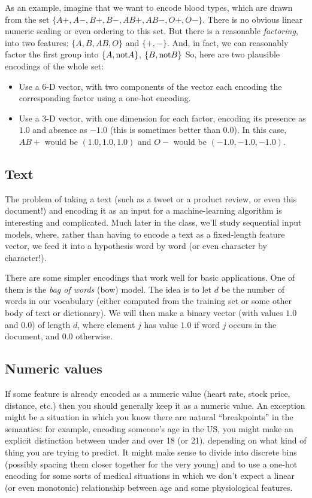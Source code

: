 As an example, imagine that we want to encode blood types, which are
drawn from the set $\{A+, A-, B+, B-, AB+, AB-, O+, O-\}$.  
There is no obvious linear numeric scaling or even ordering to this
set.  But there is a reasonable {\em factoring}, into two features:
$\{A, B, AB, O\}$ and $\{+, -\}$.  And, in fact, we can reasonably
factor the first group into $\{A, {\rm not}A\}$, $\{B, {\rm not}B\}$
   So, here are two plausible
encodings of the whole set:
\begin{itemize}
\item Use a 6-D vector, with two components of the vector each encoding the
  corresponding factor using a one-hot encoding.
\item Use a 3-D vector, with one dimension for each factor, encoding
  its presence as $1.0$ and absence as $-1.0$ (this is sometimes
  better than $0.0$).  In this case, $AB+$ would be $(1.0, 1.0, 1.0)$
  and $O-$ would be $(-1.0, -1.0, -1.0)$.
\end{itemize}

\subsection{Text}
The problem of taking a text (such as a tweet or a product review, or
even this document!) and encoding it as an input for a
machine-learning algorithm is interesting and complicated.  Much later
in the class, we'll study sequential input models, where, rather than
having to encode a text as a fixed-length feature vector, we feed it
into a hypothesis word by word (or even character by character!).

There are some simpler encodings that work well for basic
applications.  One of them is the {\em bag of words} ({\sc bow})
model.  The idea is to let $d$ be the number of words in our
vocabulary (either computed from the training set or some other body
of text or dictionary).  We will then make a binary vector (with
values $1.0$ and $0.0$) of length $d$, where element $j$ has value
$1.0$ if word $j$ occurs in the document, and $0.0$ otherwise.

\subsection{Numeric values}
\label{realFeatures}
If some feature is already encoded as a numeric value (heart rate,
stock price, distance, etc.) then you should generally keep it as a
numeric value.   An exception might be a situation in which you know
there are natural ``breakpoints'' in the semantics:  for example,
encoding someone's age in the US, you might make an explicit
distinction between under and over 18 (or 21), depending on what kind
of thing you are trying to predict.   It might make sense to divide
into discrete bins (possibly spacing them closer together for the very
young) and to use a one-hot encoding for some sorts of medical situations
in which we don't expect a linear (or even monotonic) relationship
between age and some physiological features.

